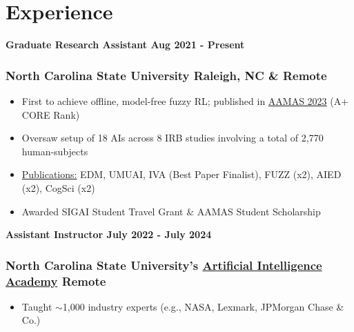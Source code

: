 \section{Experience}
\vspace{-8pt}

\noindent\textbf{Graduate Research Assistant \hfill Aug 2021 - Present}
\subsubsection{North Carolina State University \hfill  Raleigh, NC \& Remote}
\vspace{-2pt}
\begin{itemize}
\setlength\itemsep{-0.5em}
	\item First to achieve offline, model-free fuzzy RL; published in \href{https://dl.acm.org/doi/10.5555/3545946.3598770}{AAMAS 2023} (A+ CORE Rank)
     \item Oversaw setup of 18 AIs across 8 IRB studies involving a total of 2,770 human-subjects
    \item \href{https://scholar.google.com/citations?user=lJkPFpwAAAAJ&hl=en}{Publications:} EDM, UMUAI, IVA {\footnotesize (Best Paper Finalist)}, FUZZ {\footnotesize (x2)}, AIED {\footnotesize (x2)}, CogSci {\footnotesize (x2)}
    \item Awarded SIGAI Student Travel Grant \& AAMAS Student Scholarship 
\end{itemize}

\vspace{-4pt}

\noindent\textbf{Assistant Instructor \hfill July 2022 - July 2024}
\subsubsection{North Carolina State University's \href{https://ai-academy.ncsu.edu/}{Artificial Intelligence Academy} \hfill Remote}
\vspace{-2pt}
\begin{itemize}
	\item Taught $\sim$1,000 industry experts (e.g., NASA, Lexmark, JPMorgan Chase \& Co.)
\end{itemize}


